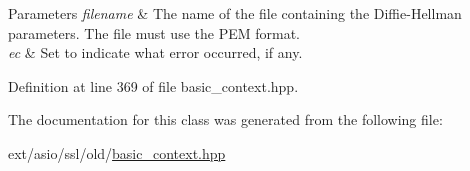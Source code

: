 \begin{DoxyParams}{Parameters}
{\em filename} & The name of the file containing the Diffie-\/\+Hellman parameters. The file must use the P\+E\+M format.\\
\hline
{\em ec} & Set to indicate what error occurred, if any. \\
\hline
\end{DoxyParams}


Definition at line 369 of file basic\+\_\+context.\+hpp.



The documentation for this class was generated from the following file\+:\begin{DoxyCompactItemize}
\item 
ext/asio/ssl/old/\hyperlink{old_2basic__context_8hpp}{basic\+\_\+context.\+hpp}\end{DoxyCompactItemize}
